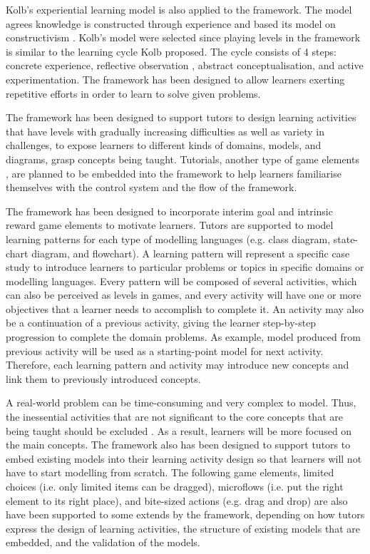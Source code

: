 \documentclass[12pt, a4paper]{report} \usepackage[titletoc]{appendix}
\begin{document}
Kolb's experiential learning model \cite{kolb2014experiential} is also applied to the framework. The model agrees knowledge is constructed through experience and based its model on constructivism \cite{kolb2014experiential}. Kolb's model were selected since playing levels in the framework is similar to the learning cycle Kolb proposed. The cycle consists of 4 steps: concrete experience, reflective observation , abstract conceptualisation, and active experimentation. The framework has been designed to allow learners exerting repetitive efforts in order to learn to solve given problems.

The framework has been designed to support tutors to design learning activities that have levels with gradually increasing difficulties as well as variety in challenges, to expose learners to different kinds of domains, models, and diagrams, grasp concepts being taught. Tutorials, another type of game elements \cite{deterding2015lens}, are planned to be embedded into the framework to help learners familiarise themselves with the control system and the flow of the framework. 

The framework has been designed to incorporate interim goal and intrinsic reward game elements \cite{deterding2015lens} to motivate learners. Tutors are supported to model learning patterns for each type of modelling languages (e.g. class diagram, state-chart diagram, and flowchart). A learning pattern will represent a specific case study to introduce learners to particular problems or topics in specific domains or modelling languages. Every pattern will be composed of several activities, which can also be perceived as levels in games, and every activity will have one or more objectives that a learner needs to accomplish to complete it. An activity may also be a continuation of a previous activity, giving the learner step-by-step progression to complete the domain problems. As example, model produced from previous activity will be used as a starting-point model for next activity. Therefore, each learning pattern and activity may introduce new concepts and link them to previously introduced concepts.

A real-world problem can be time-consuming and very complex to model. Thus, the inessential activities that are not significant to the core concepts that are being taught should be excluded \cite{deterding2015lens}. As a result, learners will be more focused on the main concepts. The framework also has been designed to support tutors to embed existing models into their learning activity design so that learners will not have to start modelling from scratch. The following game elements, limited choices (i.e. only limited items can be dragged), microflows (i.e. put the right element to its right place), and bite-sized actions (e.g. drag and drop) \cite{deterding2015lens} are also have been supported to some extends by the framework, depending on how tutors express the design of learning activities, the structure of existing models that are embedded, and the validation of the models. 
\end{document}
